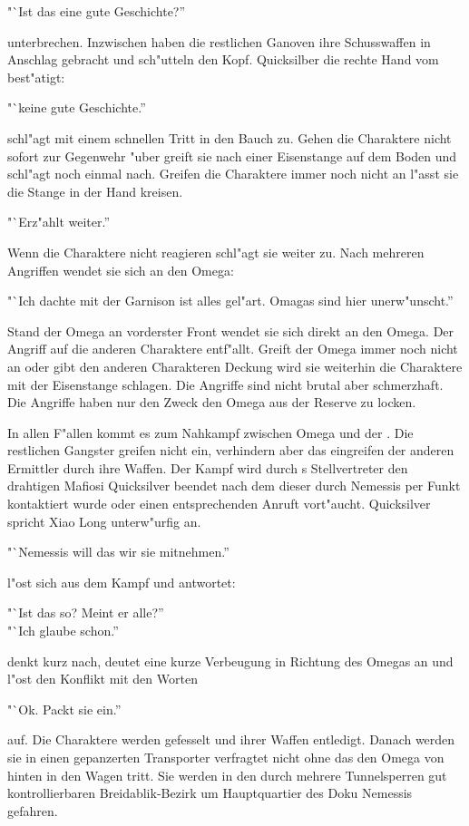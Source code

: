 "`Ist das eine gute Geschichte?''

unterbrechen. Inzwischen haben die restlichen Ganoven ihre Schusswaffen in Anschlag gebracht und sch"utteln den Kopf. Quicksilber die rechte Hand vom \xl{} best"atigt:

"`keine gute Geschichte.''

\xl{} schl"agt mit einem schnellen Tritt in den Bauch zu. Gehen die Charaktere nicht sofort zur Gegenwehr "uber greift sie nach einer Eisenstange auf dem Boden und schl"agt noch einmal nach. Greifen die Charaktere immer noch nicht an l"asst sie die Stange in der Hand kreisen.

"`Erz"ahlt weiter.''

Wenn die Charaktere nicht reagieren schl"agt sie weiter zu. Nach mehreren Angriffen wendet sie sich an den Omega:

"`Ich dachte mit der Garnison ist alles gel"art. Omagas sind hier unerw"unscht.''

Stand der Omega an vorderster Front wendet sie sich direkt an den Omega. Der Angriff auf die anderen Charaktere entf"allt. Greift der Omega immer noch nicht an oder gibt den anderen Charakteren Deckung wird sie weiterhin die Charaktere mit der Eisenstange schlagen. Die Angriffe sind nicht brutal aber schmerzhaft. Die Angriffe haben nur den Zweck den Omega aus der Reserve zu locken.

In allen F"allen kommt es zum Nahkampf zwischen Omega und der \xl. Die restlichen Gangster greifen nicht ein, verhindern aber das eingreifen der anderen Ermittler durch ihre Waffen. Der Kampf wird durch \xl{}s Stellvertreter den drahtigen Mafiosi Quicksilver beendet nach dem dieser durch Nemessis per Funkt kontaktiert wurde oder einen entsprechenden Anruft vort"aucht. Quicksilver spricht Xiao Long unterw"urfig an.

"`Nemessis will das wir sie mitnehmen.''

\xl{} l"ost sich aus dem Kampf und antwortet:

"`Ist das so? Meint er alle?''\\
"`Ich glaube schon.''

\xl{} denkt kurz nach, deutet eine kurze Verbeugung in Richtung des Omegas an und l"ost den Konflikt mit den Worten

"`Ok. Packt sie ein.''

auf. Die Charaktere werden gefesselt und ihrer Waffen entledigt. Danach werden sie in einen gepanzerten Transporter verfragtet nicht ohne das \xl{} den Omega von hinten in den Wagen tritt. Sie werden in den durch mehrere Tunnelsperren gut kontrollierbaren Breidablik-Bezirk um Hauptquartier des Doku Nemessis gefahren.

